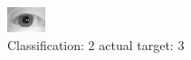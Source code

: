 \begin{figure}[h!]
\begin{center}
\includegraphics[width=0.60\columnwidth]{figures/ID1170_class_2_target_3.png}
\end{center}
\caption{ Classification: 2 actual target: 3}
\label{fig:ID1170_class_2_target_3}
\end{figure}

